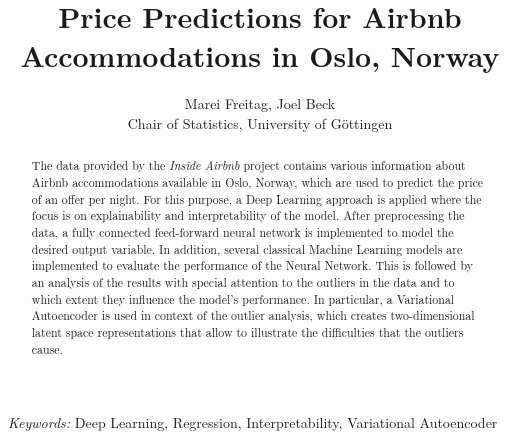 \begin{titlepage}

    \title{\bf Price Predictions for Airbnb Accommodations in Oslo, Norway}

    \author{Marei Freitag, Joel Beck \hspace{.2cm}\\ Chair of Statistics, University of G\"ottingen\\}

    \maketitle

    \bigskip

    \begin{abstract}
        \noindent The data provided by the \emph{Inside Airbnb} project contains various information about Airbnb accommodations available in Oslo, Norway, which are used to predict the price of an offer per night.
        For this purpose, a Deep Learning approach is applied where the focus is on explainability and interpretability of the model. After preprocessing the data, a fully connected feed-forward neural network is implemented to model the desired output variable.
        In addition, several classical Machine Learning models are implemented to evaluate the performance of the Neural Network.
        This is followed by an analysis of the results with special attention to the outliers in the data and to which extent they influence the model's performance.
        In particular, a Variational Autoencoder is used in context of the outlier
        analysis, which creates two-dimensional latent space representations that allow to illustrate the difficulties that the outliers cause.
    \end{abstract}

    \noindent%
    {\it Keywords:}  Deep Learning, Regression, Interpretability, Variational Autoencoder
    \vfill

\end{titlepage}

